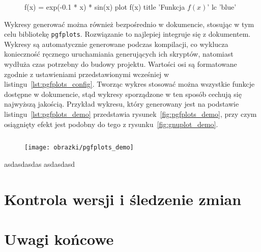 \begin{figure}[!htb]
\begin{gnuplot}[terminal = tikz, terminaloptions = {size 15.5, 7}]
	f(x) = exp(-0.1 * x) * sin(x)
	plot f(x) title 'Funkcja $f(x)$' lc 'blue'
\end{gnuplot}
\end{figure}

Wykresy generować można również bezpośrednio w dokumencie, stosując w tym celu bibliotekę \texttt{pgfplots}. Rozwiązanie to najlepiej integruje się z dokumentem. Wykresy są automatycznie generowane podczas kompilacji, co wyklucza konieczność ręcznego uruchamiania generujących ich skryptów, natomiast wydłuża czas potrzebny do budowy projektu. Wartości osi są formatowane zgodnie z ustawieniami przedstawionymi wcześniej w listingu~\ref{lst:pgfplots_config}. Tworząc wykres stosować można wszystkie funkcje dostępne w dokumencie, stąd wykresy sporządzone w ten sposób cechują się najwyższą jakością. Przykład wykresu, który generowany jest na podstawie listingu~\ref{lst:pgfplots_demo} przedstawia rysunek~\ref{fig:pgfplots_demo}, przy czym osiągnięty efekt jest podobny do tego z rysunku~\ref{fig:gnuplot_demo}.

\begin{listing}[hbt]
\inputminted{latex}{obrazki/pgfplots_demo.tex}
\end{listing}

\begin{figure}[!htb]
\texttt{[image: obrazki/pgfplots\_demo]}
\end{figure}

asdasdasdas asdasdasd

\section{Kontrola wersji i śledzenie zmian}

\section{Uwagi końcowe}
